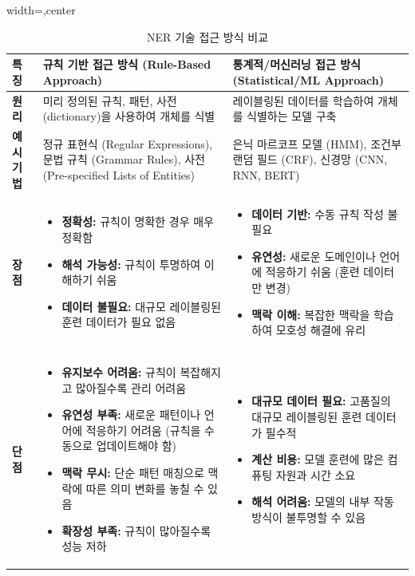 \documentclass[11pt,a4paper]{article}
\begin{document}
\begin{table}[h!]
\caption{NER 기술 접근 방식 비교}
\label{tab:ner_approaches}
\centering
\begin{adjustbox}{width=\textwidth,center}
\begin{tabular}{p{}p{}p{}}
\toprule
\textbf{특징} & \textbf{규칙 기반 접근 방식 (Rule-Based Approach)} & \textbf{통계적/머신러닝 접근 방식 (Statistical/ML Approach)} \\
\midrule
\textbf{원리} & 미리 정의된 규칙, 패턴, 사전(dictionary)을 사용하여 개체를 식별 & 레이블링된 데이터를 학습하여 개체를 식별하는 모델 구축 \\
\textbf{예시 기법} & 정규 표현식 (Regular Expressions), 문법 규칙 (Grammar Rules), 사전 (Pre-specified Lists of Entities) & 은닉 마르코프 모델 (HMM), 조건부 랜덤 필드 (CRF), 신경망 (CNN, RNN, BERT) \\
\textbf{장점} & \begin{itemize}
    \item \textbf{정확성:} 규칙이 명확한 경우 매우 정확함
    \item \textbf{해석 가능성:} 규칙이 투명하여 이해하기 쉬움
    \item \textbf{데이터 불필요:} 대규모 레이블링된 훈련 데이터가 필요 없음
\end{itemize} & \begin{itemize}
    \item \textbf{데이터 기반:} 수동 규칙 작성 불필요
    \item \textbf{유연성:} 새로운 도메인이나 언어에 적응하기 쉬움 (훈련 데이터만 변경)
    \item \textbf{맥락 이해:} 복잡한 맥락을 학습하여 모호성 해결에 유리
\end{itemize} \\
\textbf{단점} & \begin{itemize}
    \item \textbf{유지보수 어려움:} 규칙이 복잡해지고 많아질수록 관리 어려움
    \item \textbf{유연성 부족:} 새로운 패턴이나 언어에 적응하기 어려움 (규칙을 수동으로 업데이트해야 함)
    \item \textbf{맥락 무시:} 단순 패턴 매칭으로 맥락에 따른 의미 변화를 놓칠 수 있음
    \item \textbf{확장성 부족:} 규칙이 많아질수록 성능 저하
\end{itemize} & \begin{itemize}
    \item \textbf{대규모 데이터 필요:} 고품질의 대규모 레이블링된 훈련 데이터가 필수적
    \item \textbf{계산 비용:} 모델 훈련에 많은 컴퓨팅 자원과 시간 소요
    \item \textbf{해석 어려움:} 모델의 내부 작동 방식이 불투명할 수 있음
\end{itemize} \\
\bottomrule
\end{tabular}
\end{adjustbox}
\end{table}
\end{document}
